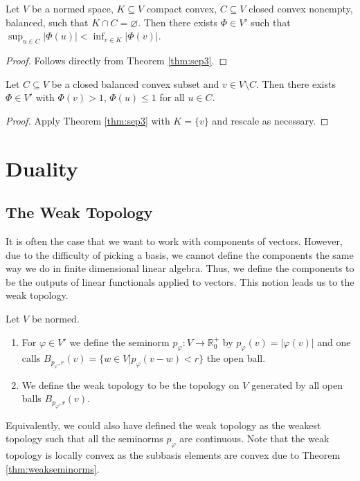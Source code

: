 \documentclass[twoside,symmetric, openany, 12pt]{./tuftebook}
\theoremstyle{definition}
\theoremstyle{definition}
\theoremstyle{definition}
\newenvironment{parts}{\begin{enumerate}[label=(\alph*)]}{\end{enumerate}}
\newcommand{\R}{\mathbb{R}}
\begin{document}
\begin{Theorem} \label{thm:sep3}
	Let $V$ be a normed space, $K\subseteq V$ compact convex, $C\subseteq V$ closed convex nonempty, balanced, such that $K\cap C=\varnothing$. Then there exists $\Phi\in V'$ such that $\sup_{u\in C}|\Phi(u)| < \inf_{v\in K}|\Phi(v)|$.
\end{Theorem}
\begin{proof}
	Follows directly from Theorem \ref{thm:sep3}.
\end{proof}
\begin{Corollary}
	Let $C\subseteq V$ be a closed balanced convex subset and $v\in V \setminus C$. Then there exists $\Phi\in V'$ with $\Phi(v)>1$, $\Phi(u)\le 1$ for all $u\in C$.
\end{Corollary}
\begin{proof}
	Apply Theorem \ref{thm:sep3} with $K=\{v\} $ and rescale as necessary.
\end{proof}
\section{Duality}
\subsection{The Weak Topology}
It is often the case that we want to work with components of vectors. However, due to the difficulty of picking a basis, we cannot define the components the same way we do in finite dimensional linear algebra. Thus, we define the components to be the outputs of linear functionals applied to vectors. This notion leads us to the weak topology.
\begin{Definition}
	Let $V$ be normed.
	\begin{parts}
		\item For $\varphi\in V'$ we define the seminorm $p_\varphi:V \to \R_0^+$ by $p_\varphi(v)=|\varphi(v)|$ and one calls $B_{p_\varphi, r}(v) =\{w\in V|p_\varphi(v-w)<r\} $ the open ball.
		\item We define the weak topology to be the topology on $V$ generated by all open balls $B_{p_{\varphi}, r}(v)$.
	\end{parts}
\end{Definition}
Equivalently, we could also have defined the weak topology as the weakest topology such that all the seminorms $p_{\varphi}$ are continuous. Note that the weak topology is locally convex as the subbasis elements are convex due to Theorem \ref{thm:weakseminorms}.
\end{document}

